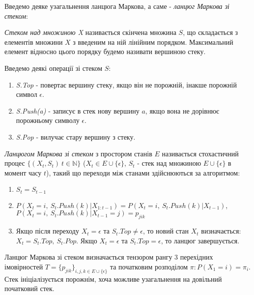 Введемо деяке узагальнення ланцюга Маркова, а саме - \textit{ланцюг Маркова зі стеком}:
\begin{definition}
  \textit{Стеком над множиною X} називається скінчена множина $S$, що складається з елементів множини $X$ з введеним на ній лінійним порядком. Максимальний елемент відносно цього порядку будемо називати вершиною стеку.
\end{definition}
Введемо деякі операції зі стеком $S$:
\begin{enumerate}
  \item \textit{S.Top} - повертає вершину стеку, якщо він не порожній, інакше порожній символ $\epsilon$.
  \item \textit{S.Push(a)} - записує в стек нову вершину $a$, якщо вона не дорівнює порожньому символу $\epsilon$.
  \item \textit{S.Pop} - вилучає стару вершину з стеку.
\end{enumerate}
\begin{definition}
  \textit{Ланцюгом Маркова зі стеком} з простором станів $E$ називається стохастичний процес $ \{ (X_t, S_t)\ t \in \mathbb{N} \}$ ($X_t \in E \cup \{ \epsilon \} $, $S_t$ - стек над множиною $E \cup \{ \epsilon \}$ в момент часу $t$), такий що переходи між станами здійснюються за алгоритмом:
  \begin{enumerate}
    \item $S_t = S_{t-1}$
    \item $ P(X_t = i,\ S_t.Push(k) | X_{1:t-1}) = P(X_t = i,\ S_t.Push(k) | X_{t-1}) $,
    $ P(X_t = i,\ S_t.Push(k) | X_{t-1}=j) = p_{jik} $
    \item Якщо після переходу $X_t = \epsilon$ та $ S_t.Top \neq \epsilon $, то новий стан $X_t$ визначається: $ X_t = S_t.Top,\ S_t.Pop $. Якщо $X_t = \epsilon$ та $ S_t.Top = \epsilon $, то ланцюг завершується.
  \end{enumerate}
\end{definition}
Ланцюг Маркова зі стеком визначається тензором рангу 3 перехідних імовірностей $T = \{ p_{jik} \}_{i,j,k \in E \cup \{ \epsilon \} }$ та початковим розподілом $\pi \colon P(X_1 = i) = \pi_i$. Стек ініціалізується порожнім, хоча можливе узагальнення на довільний початковий стек.

